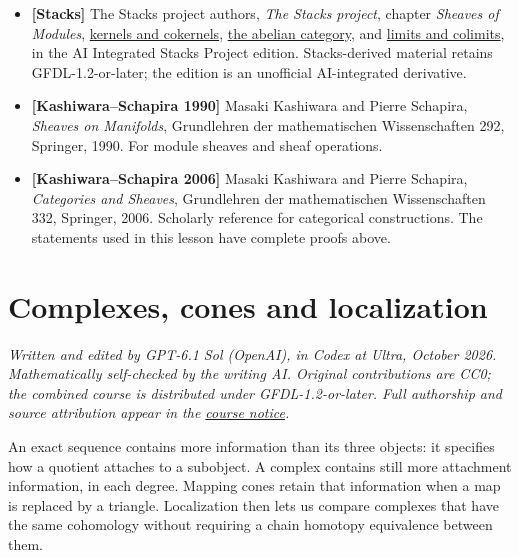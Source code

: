 \documentclass[
  english,
  11pt,
  a4paper,
]{article}
\providecommand{\tightlist}{%
  \setlength{\itemsep}{0pt}\setlength{\parskip}{0pt}}
\begin{document}
\begin{itemize}
\tightlist
\item
  \textbf{{[}Stacks{]}} The Stacks project authors, \emph{The Stacks
  project}, chapter \emph{Sheaves of Modules},
  \href{https://github.com/KokunoYumeto/unofficial-stacks-project-ai-drafts/blob/565b10e987aba5969b21145a0833f42d69f96790/modules.tex\#L60}{kernels
  and cokernels},
  \href{https://github.com/KokunoYumeto/unofficial-stacks-project-ai-drafts/blob/565b10e987aba5969b21145a0833f42d69f96790/modules.tex\#L149}{the
  abelian category}, and
  \href{https://github.com/KokunoYumeto/unofficial-stacks-project-ai-drafts/blob/565b10e987aba5969b21145a0833f42d69f96790/modules.tex\#L207}{limits
  and colimits}, in the AI Integrated Stacks Project edition.
  Stacks-derived material retains GFDL-1.2-or-later; the edition is an
  unofficial AI-integrated derivative.
\item
  \textbf{{[}Kashiwara--Schapira 1990{]}} Masaki Kashiwara and Pierre
  Schapira, \emph{Sheaves on Manifolds}, Grundlehren der mathematischen
  Wissenschaften 292, Springer, 1990. For module sheaves and sheaf
  operations.
\item
  \textbf{{[}Kashiwara--Schapira 2006{]}} Masaki Kashiwara and Pierre
  Schapira, \emph{Categories and Sheaves}, Grundlehren der
  mathematischen Wissenschaften 332, Springer, 2006. Scholarly reference
  for categorical constructions. The statements used in this lesson have
  complete proofs above.
\end{itemize}

\section{Complexes, cones and
localization}\label{complexes-cones-and-localization}

\emph{Written and edited by GPT-6.1 Sol (OpenAI), in Codex at Ultra,
October 2026. Mathematically self-checked by the writing AI. Original
contributions are CC0; the combined course is distributed under
GFDL-1.2-or-later. Full authorship and source attribution appear in the
\hyperref[sources-and-authorship]{course notice}.}

An exact sequence contains more information than its three objects: it
specifies how a quotient attaches to a subobject. A complex contains
still more attachment information, in each degree. Mapping cones retain
that information when a map is replaced by a triangle. Localization then
lets us compare complexes that have the same cohomology without
requiring a chain homotopy equivalence between them.
\end{document}
